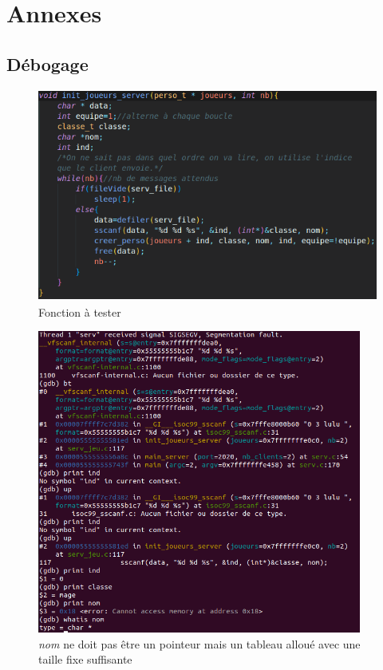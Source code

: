 \documentclass[11pt]{article}
\begin{document}
    \newpage
    \section{Annexes}
        \subsection{Débogage}
        
        \begin{figure}[H]
            \centering
            \includegraphics[height=7cm]{fonction.png}
            \caption{Fonction à tester}
        \end{figure}
        \begin{figure}[H]
            \centering
            \includegraphics[height=10cm]{gdb.png}
            \caption{\textit{nom} ne doit pas être un pointeur mais un tableau alloué avec une taille fixe suffisante}
        \end{figure}
\end{document}
